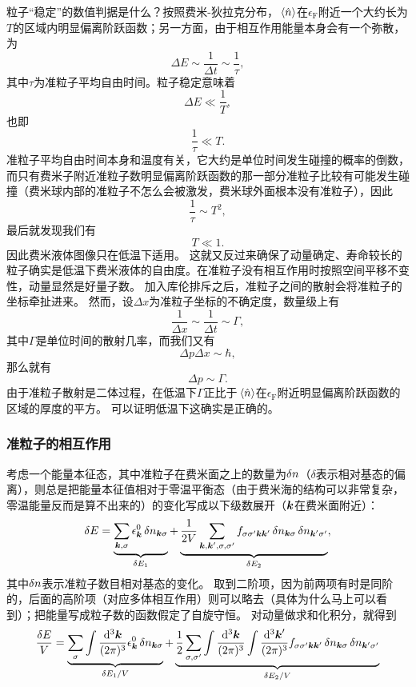 \documentclass[hyperref, UTF8, a4paper]{ctexart}
\begin{document}
粒子“稳定”的数值判据是什么？按照费米-狄拉克分布，$\expval*{\hat{n}}$在$\epsilon_\text{F}$附近一个大约长为$T$的区域内明显偏离阶跃函数；另一方面，由于相互作用能量本身会有一个弥散，为
\[
    \Delta E \sim \frac{1}{\Delta t} \sim \frac{1}{\tau},
\]
其中$\tau$为准粒子平均自由时间。粒子稳定意味着
\[
    \Delta E \ll \frac{1}{T},
\]
也即
\[
    \frac{1}{\tau} \ll T.
\]
准粒子平均自由时间本身和温度有关，它大约是单位时间发生碰撞的概率的倒数，而只有费米子附近准粒子数明显偏离阶跃函数的那一部分准粒子比较有可能发生碰撞（费米球内部的准粒子不怎么会被激发，费米球外面根本没有准粒子），因此
\[
    \frac{1}{\tau} \sim T^2,
\]
最后就发现我们有
\[
    T \ll 1.
\]
因此费米液体图像只在低温下适用。
这就又反过来确保了动量确定、寿命较长的粒子确实是低温下费米液体的自由度。在准粒子没有相互作用时按照空间平移不变性，动量显然是好量子数。
加入库伦排斥之后，准粒子之间的散射会将准粒子的坐标牵扯进来。
然而，设$\Delta x$为准粒子坐标的不确定度，数量级上有
\[
    \frac{1}{\Delta x} \sim \frac{1}{\Delta t} \sim \Gamma,
\]
其中$\Gamma$是单位时间的散射几率，而我们又有
\[
    \Delta p \Delta x \sim \hbar,
\]
那么就有
\[
    \Delta p \sim \Gamma.
\]
由于准粒子散射是二体过程，在低温下$\Gamma$正比于$\expval*{\hat{n}}$在$\epsilon_\text{F}$附近明显偏离阶跃函数的区域的厚度的平方。
可以证明低温下这确实是正确的。

\subsubsection{准粒子的相互作用}

考虑一个能量本征态，其中准粒子在费米面之上的数量为$\var{n}$（$\delta$表示相对基态的偏离），则总是把能量本征值相对于零温平衡态（由于费米海的结构可以非常复杂，零温能量反而是算不出来的）的变化写成以下级数展开（$\vb*{k}$在费米面附近）：
\begin{equation}
    \var{E} = \underbrace{\sum_{\vb*{k}, \sigma} \epsilon^0_{\vb*{k}} \var{n_{\vb*{k} \sigma}}}_{\var{E_1}} + \underbrace{\frac{1}{2V} \sum_{\vb*{k}, \vb*{k}', \sigma, \sigma'} f_{\sigma \sigma' \vb*{k} \vb*{k}'} \var{n_{\vb*{k} \sigma}} \var{n_{\vb*{k}' \sigma'}}}_{\var{E_2}},
    \label{eq:fermi-liquid-energy}
\end{equation}
其中$\var{n}$表示准粒子数目相对基态的变化。
取到二阶项，因为前两项有时是同阶的，后面的高阶项（对应多体相互作用）则可以略去（具体为什么马上可以看到）；把能量写成粒子数的函数假定了自旋守恒。
对动量做求和化积分，就得到
\begin{equation}
    \frac{\var{E}}{V} = \underbrace{\sum_{\sigma} \int \frac{\dd[3]{\vb*{k}}}{(2\pi)^3} \epsilon^0_{\vb*{k}} \var{n_{\vb*{k} \sigma}}}_{\var{E_1} / V} + \underbrace{\frac{1}{2} \sum_{\sigma, \sigma'} \int \frac{\dd[3]{\vb*{k}}}{(2\pi)^3} \int \frac{\dd[3]{\vb*{k}'}}{(2\pi)^3} f_{\sigma \sigma' \vb*{k} \vb*{k}'} \var{n_{\vb*{k} \sigma}} \var{n_{\vb*{k}' \sigma'}}}_{\var{E_2} / V}
\end{equation}
\end{document}

